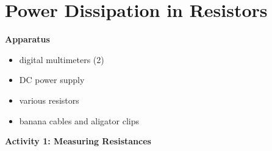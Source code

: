 \section{Power Dissipation in Resistors}

\makelabheader %

\textbf{Apparatus}
\begin{itemize}
\item digital multimeters (2)
\item DC power supply 
\item various resistors
\item banana cables and aligator clips
\end{itemize}

\textbf{Activity 1: Measuring Resistances}

